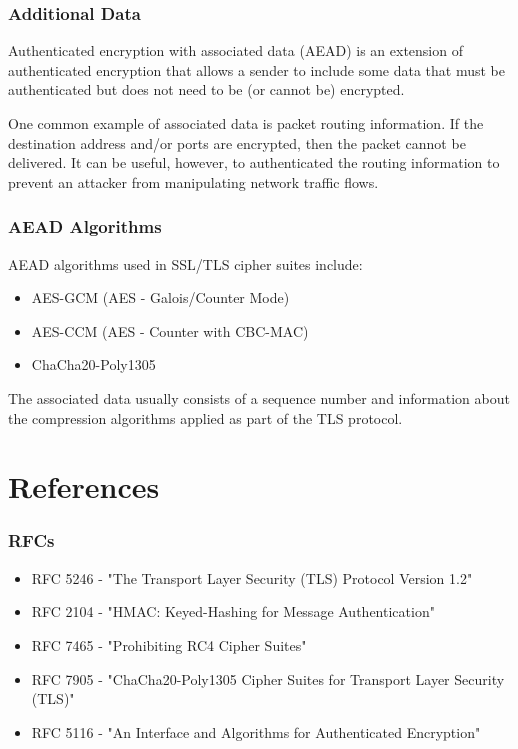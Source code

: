 \documentclass[aspectratio=169]{beamer}
\begin{document}
\begin{frame}[triangle=siiblue]
	\frametitle{Additional Data}
	Authenticated encryption with associated data (AEAD) is an extension of authenticated encryption that allows a sender to include some data that must be authenticated but does not need to be (or cannot be) encrypted.
	
	\vfill
	
	One common example of associated data is packet routing information.  If the destination address and/or ports are encrypted, then the packet cannot be delivered.  It can be useful, however, to authenticated the routing information to prevent an attacker from manipulating network traffic flows.
\end{frame}

\begin{frame}[triangle=siiblue]
	\frametitle{AEAD Algorithms}
	AEAD algorithms used in SSL/TLS cipher suites include:
	\begin{itemize}
		\item AES-GCM (AES - Galois/Counter Mode)
		\item AES-CCM (AES - Counter with CBC-MAC)
		\item ChaCha20-Poly1305
	\end{itemize}

	\vfill
	
	The associated data usually consists of a sequence number and information about the compression algorithms applied as part of the TLS protocol.
\end{frame}

\section{References}
\begin{frame}[Triangle=siiorange]
	\tocpage
\end{frame}

\begin{frame}[triangle=siiblue]
	\frametitle{RFCs}
	\begin{itemize}
		\item RFC 5246 - "The Transport Layer Security (TLS) Protocol Version 1.2"
		
		\vfill
				
		\item RFC 2104 - "HMAC: Keyed-Hashing for Message Authentication"

		\vfill
				
		\item RFC 7465 - "Prohibiting RC4 Cipher Suites"

		\vfill
				
		\item RFC 7905 - "ChaCha20-Poly1305 Cipher Suites for Transport Layer Security (TLS)"

		\vfill
				
		\item RFC 5116 - "An Interface and Algorithms for Authenticated Encryption"
	\end{itemize}
\end{frame}
\end{document}

